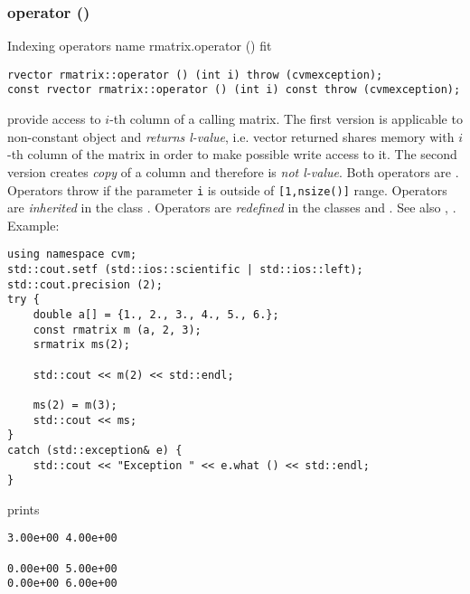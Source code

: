 \subsubsection{operator ()}
Indexing operators%
\pdfdest name {rmatrix.operator ()} fit
\begin{verbatim}
rvector rmatrix::operator () (int i) throw (cvmexception);
const rvector rmatrix::operator () (int i) const throw (cvmexception);
\end{verbatim}
provide access to  \hbox{$i$-th} column of a calling matrix. The first version
is applicable to non-constant object and
\emph{returns  l-value}, i.e. vector returned shares  memory
with \hbox{$i$-th} column of the matrix
in order to make possible write access to it.
The second version creates  \emph{copy} of a column and therefore is
\emph{not l-value}.
Both operators are \Based.
Operators throw 
if the parameter \verb"i" is outside of \verb"[1,nsize()]" range.
Operators are \emph{inherited}
in  the class
.
Operators are \emph{redefined}
in  the classes 
and .
See also ,
.
Example:
\begin{Verbatim}
using namespace cvm;
std::cout.setf (std::ios::scientific | std::ios::left);
std::cout.precision (2);
try {
    double a[] = {1., 2., 3., 4., 5., 6.};
    const rmatrix m (a, 2, 3);
    srmatrix ms(2);

    std::cout << m(2) << std::endl;

    ms(2) = m(3);
    std::cout << ms;
}
catch (std::exception& e) {
    std::cout << "Exception " << e.what () << std::endl;
}
\end{Verbatim}
prints
\begin{Verbatim}
3.00e+00 4.00e+00

0.00e+00 5.00e+00
0.00e+00 6.00e+00
\end{Verbatim}
\newpage


